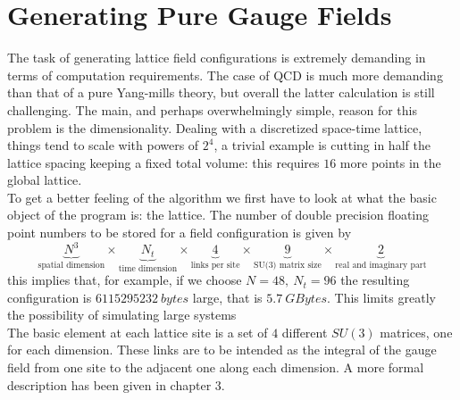 \section{Generating Pure Gauge Fields}
The task of generating lattice field configurations is extremely demanding in terms of computation requirements. The case of QCD is much more demanding than that of a pure Yang-mills theory, but overall the latter calculation is still challenging. The main, and perhaps overwhelmingly simple, reason for this problem is the dimensionality. Dealing with a discretized space-time lattice, things tend to scale with powers of $2^4$, a trivial example is cutting in half the lattice spacing keeping a fixed total volume: this requires $16$ more points in the global lattice. \\
To get a better feeling of the algorithm we first have to look at what the basic object of the program is: the lattice. The number of double precision floating point numbers to be stored for a field configuration is given by
\begin{equation}
    \underbrace{N^3}_\text{spatial dimension} \times
    \underbrace{N_t}_\text{time dimension} \times
    \underbrace{4}_\text{links per site} \times 
    \underbrace{9}_\text{SU(3) matrix size} \times
    \underbrace{2}_\text{real and imaginary part}
\end{equation}
this implies that, for example, if we choose $N=48,~N_t=96$ the resulting configuration is $6115295232~bytes$ large, that is $5.7~GBytes$.  This limits greatly the possibility of simulating large systems \\
The basic element at each lattice site is a set of $4$ different $SU(3)$ matrices, one for each dimension. These links are to be intended as the integral of the gauge field from one site to the adjacent one along each dimension. A more formal description has been given in chapter 3.\\
